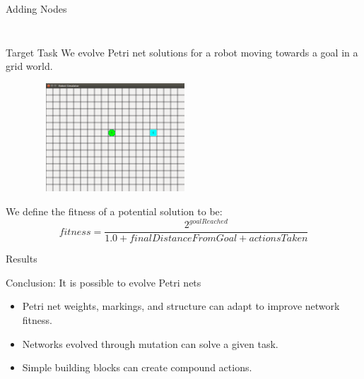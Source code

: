 \documentclass[12pt]{beamer}
\begin{document}
\begin{frame}{Adding Nodes}
\begin{columns}[]
\begin{column}{2in}
 \begin{figure}
\end{figure}
  \end{column}
\end{columns}
\end{frame}

\begin{frame}{Target Task}
We evolve Petri net solutions for a robot moving towards a goal in a grid world.
\begin{figure}
\includegraphics[trim = 80mm 80mm 20mm 70mm, clip, width = 2.4in, height = 1.6in]{robot_sim.png}
\end{figure}
We define the fitness of a potential solution to be:
$$fitness = \frac{2^{goalReached}}{1.0 + finalDistanceFromGoal + actionsTaken}$$
\end{frame}

\begin{frame}{Results}

Conclusion: It is possible to evolve Petri nets
\begin{itemize}
\item Petri net weights, markings, and structure can adapt to improve network fitness.
\item Networks evolved through mutation can solve a given task.
\item Simple building blocks can create compound actions.
\end{itemize}
\end{frame}
\end{document}
